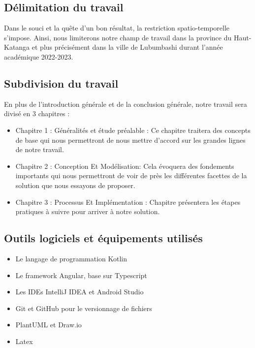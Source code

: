 \subsection{Délimitation du travail}
Dans le souci et la quête d’un bon résultat, la restriction spatio-temporelle s’impose. Ainsi, nous limiterons notre champ de travail dans la province du Haut-Katanga et plus précisément dans la ville de Lubumbashi durant l’année académique 2022-2023.

\subsection{Subdivision du travail}
En plus de l'introduction générale et de la conclusion générale, notre travail sera divisé en 3 chapitres :

\begin{itemize}
	\item Chapitre 1 : Généralités et étude préalable : Ce chapitre traitera des concepts de base qui nous permettront de nous mettre d'accord sur les grandes lignes de notre travail.
	\item Chapitre 2 : Conception Et Modélisation: Cela évoquera des fondements importants qui nous permettront de voir de près les différentes facettes de la solution que nous essayons de proposer.
	\item Chapitre 3 : Processus Et Implémentation : Chapitre présentera les étapes pratiques à suivre pour arriver à notre solution.
\end{itemize}

\subsection{Outils logiciels et équipements utilisés}
\begin{itemize}
	\item Le langage de programmation Kotlin
	\item Le framework Angular, base sur Typescript
	\item Les IDEs IntelliJ IDEA et Android Studio
	\item Git et GitHub pour le versionnage de fichiers
	\item PlantUML et Draw.io
	\item Latex
\end{itemize}

